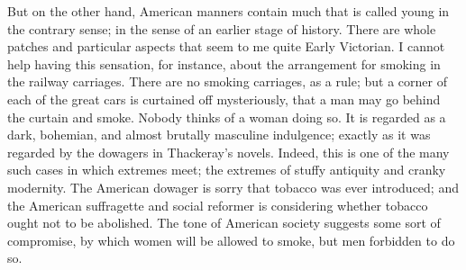 \documentclass{book}
\begin{document}
But on the other hand, American manners contain much that is called young in the contrary sense; in the sense of an earlier stage of history. There are whole patches and particular aspects that seem to me quite Early Victorian. I cannot help having this sensation, for instance, about the arrangement for smoking in the railway carriages. There are no smoking carriages, as a rule; but a corner of each of the great cars is curtained off mysteriously, that a man may go behind the curtain and smoke. Nobody thinks of a woman doing so. It is regarded as a dark, bohemian, and almost brutally masculine indulgence; exactly as it was regarded by the dowagers in Thackeray’s novels. Indeed, this is one of the many such cases in which extremes meet; the extremes of stuffy antiquity and cranky modernity. The American dowager is sorry that tobacco was ever introduced; and the American suffragette and social reformer is considering whether tobacco ought not to be abolished. The tone of American society suggests some sort of compromise, by which women will be allowed to smoke, but men forbidden to do so.
\end{document}
